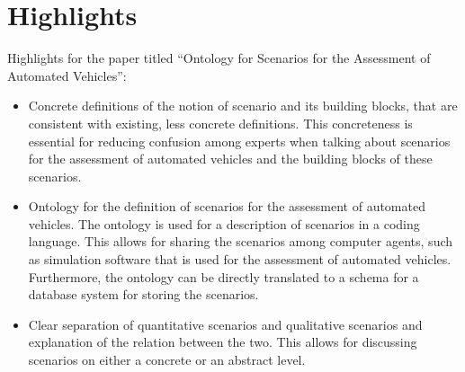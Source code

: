 \documentclass[10pt,final,a4paper,oneside,onecolumn]{article}
\begin{document}
		
\section*{Highlights}

Highlights for the paper titled ``Ontology for Scenarios for the Assessment of Automated Vehicles'':

\begin{itemize}
	\item Concrete definitions of the notion of scenario and its building blocks, that are consistent with existing, less concrete definitions. This concreteness is essential for reducing confusion among experts when talking about scenarios for the assessment of automated vehicles and the building blocks of these scenarios.
	\item Ontology for the definition of scenarios for the assessment of automated vehicles. The ontology is used for a description of scenarios in a coding language. This allows for sharing the scenarios among computer agents, such as simulation software that is used for the assessment of automated vehicles. Furthermore, the ontology can be directly translated to a schema for a database system for storing the scenarios.
	\item Clear separation of quantitative scenarios and qualitative scenarios and explanation of the relation between the two. This allows for discussing scenarios on either a concrete or an abstract level.
\end{itemize}
\end{document}
